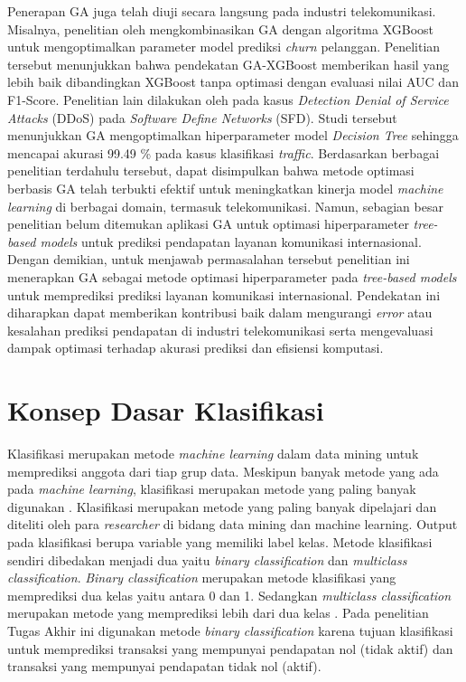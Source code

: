     Penerapan GA juga telah diuji secara langsung pada industri telekomunikasi. Misalnya, penelitian oleh  mengkombinasikan GA dengan algoritma XGBoost untuk mengoptimalkan parameter model prediksi \textit{churn} pelanggan. Penelitian tersebut menunjukkan bahwa pendekatan GA-XGBoost memberikan hasil yang lebih baik dibandingkan XGBoost tanpa optimasi dengan evaluasi nilai AUC dan F1-Score. Penelitian lain dilakukan oleh  pada kasus \textit{Detection Denial of Service Attacks} (DDoS) pada \textit{Software Define Networks} (SFD). Studi tersebut menunjukkan GA mengoptimalkan hiperparameter model \textit{Decision Tree} sehingga mencapai akurasi 99.49 \% pada kasus klasifikasi \textit{traffic}. Berdasarkan berbagai penelitian terdahulu tersebut, dapat disimpulkan bahwa metode optimasi berbasis GA telah terbukti efektif untuk meningkatkan kinerja model \textit{machine learning} di berbagai domain, termasuk telekomunikasi. Namun, sebagian besar penelitian belum ditemukan aplikasi GA untuk optimasi hiperparameter \textit{tree-based models} untuk prediksi pendapatan layanan komunikasi internasional. Dengan demikian, untuk menjawab permasalahan tersebut penelitian ini menerapkan GA sebagai metode optimasi hiperparameter pada \textit{tree-based models} untuk memprediksi prediksi layanan komunikasi internasional. Pendekatan ini diharapkan dapat memberikan kontribusi baik dalam mengurangi \textit{error} atau kesalahan prediksi pendapatan di industri telekomunikasi serta mengevaluasi dampak optimasi terhadap akurasi prediksi dan efisiensi komputasi.

    \section {Konsep Dasar Klasifikasi}
    Klasifikasi merupakan metode \textit{machine learning} dalam data mining untuk memprediksi anggota dari tiap grup data. Meskipun banyak metode yang ada pada \textit{machine learning}, klasifikasi merupakan metode yang paling banyak digunakan \cite{inproceedings}. Klasifikasi merupakan metode yang paling banyak dipelajari dan diteliti oleh para \textit{researcher} di bidang data mining dan machine learning. Output pada klasifikasi berupa variable yang memiliki label kelas. Metode klasifikasi sendiri dibedakan menjadi dua yaitu \textit{binary classification} dan \textit{multiclass classification}. \textit{Binary classification} merupakan metode klasifikasi yang memprediksi dua kelas yaitu antara 0 dan 1. Sedangkan \textit{multiclass classification} merupakan metode yang memprediksi lebih dari dua kelas \cite{ng2023cs229}. Pada penelitian Tugas Akhir ini digunakan metode \textit{binary classification} karena tujuan klasifikasi untuk memprediksi transaksi yang mempunyai pendapatan nol (tidak aktif) dan transaksi yang mempunyai pendapatan tidak nol (aktif).
    
